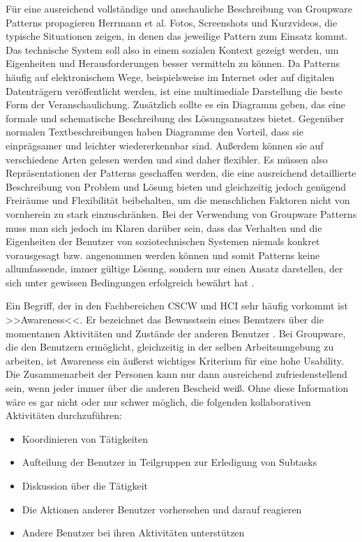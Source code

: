 \medskip Für eine ausreichend vollständige und anschauliche Beschreibung von Groupware Patterns propagieren Herrmann et al. Fotos, Screenshots und Kurzvideos, die typische Situationen zeigen, in denen das jeweilige Pattern zum Einsatz kommt. Das technische System soll also in einem sozialen Kontext gezeigt werden, um Eigenheiten und Herausforderungen besser vermitteln zu können. Da Patterns häufig auf elektronischem Wege, beispielsweise im Internet oder auf digitalen Datenträgern veröffentlicht werden, ist eine multimediale Darstellung die beste Form der Veranschaulichung. Zusätzlich sollte es ein Diagramm geben, das eine formale und schematische Beschreibung des Lösungsansatzes bietet. Gegenüber normalen Textbeschreibungen haben Diagramme den Vorteil, dass sie einprägsamer und leichter wiedererkennbar sind. Außerdem können sie auf verschiedene Arten gelesen werden und sind daher flexibler. Es müssen also Repräsentationen der Patterns geschaffen werden, die eine ausreichend detaillierte Beschreibung von Problem und Lösung bieten und gleichzeitig jedoch genügend Freiräume und Flexibilität beibehalten, um die menschlichen Faktoren nicht von vornherein zu stark einzuschränken. Bei der Verwendung von Groupware Patterns muss man sich jedoch im Klaren darüber sein, dass das Verhalten und die Eigenheiten der Benutzer von soziotechnischen Systemen niemals konkret vorausgesagt bzw. angenommen werden können und somit Patterns keine allumfassende, immer gültige Lösung, sondern nur einen Ansatz darstellen, der sich unter gewissen Bedingungen erfolgreich bewährt hat \citep{Herrmann:2003}.

\bigskip Ein Begriff, der in den Fachbereichen \ac{CSCW} und \ac{HCI} sehr häufig vorkommt ist >>Awareness<<. Er bezeichnet das Bewusstsein eines Benutzers über die momentanen Aktivitäten und Zustände der anderen Benutzer \citep{Dourish:1992, Hornecker:2008}. Bei Groupware, die den Benutzern ermöglicht, gleichzeitig in der selben Arbeitsumgebung zu arbeiten, ist Awareness ein äußerst wichtiges Kriterium für eine hohe Usability. Die Zusammenarbeit der Personen kann nur dann ausreichend zufriedenstellend sein, wenn jeder immer über die anderen Bescheid weiß. Ohne diese Information wäre es gar nicht oder nur schwer möglich, die folgenden kollaborativen Aktivitäten durchzuführen:

\begin{itemize}
	\item{Koordinieren von Tätigkeiten}
	\item{Aufteilung der Benutzer in Teilgruppen zur Erledigung von Subtasks}
	\item{Diskussion über die Tätigkeit}
	\item{Die Aktionen anderer Benutzer vorhersehen und darauf reagieren}
	\item{Andere Benutzer bei ihren Aktivitäten unterstützen}
\end{itemize}
\begin{flushright}
	\citep{Gutwin:1999}
\end{flushright} 

